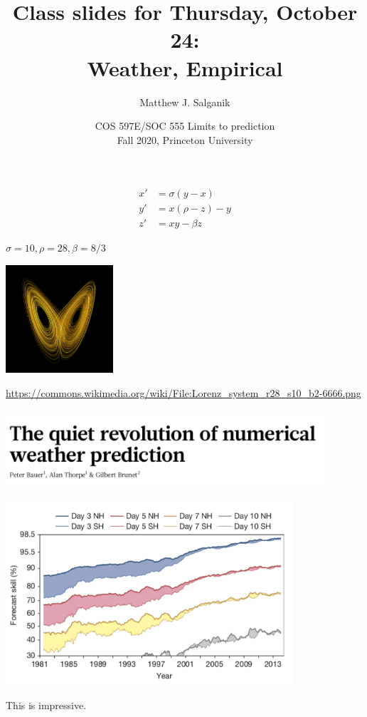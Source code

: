 \documentclass[aspectratio=169]{beamer}
\title[]{Class slides for Thursday, October 24:\\Weather, Empirical}
\author[]{Matthew J. Salganik}
\institute[]{}
\date[]{COS 597E/SOC 555 Limits to prediction\\Fall 2020, Princeton University}
\begin{document}
\frame{\titlepage}
\begin{frame}
\frametitle{}

\begin{align*}
  x' &= \sigma(y-x) \\
  y' &= x(\rho-z)-y \\
  z' &= xy-\beta z
\end{align*}
\begin{center}
$\sigma = 10, \rho = 28,  \beta = 8/3$ 
\end{center}
\begin{center}
\includegraphics[width = 0.3\textwidth]{figures/Lorenz_system_r28_s10_b2-6666}
\end{center}

\vfill
\tiny{\url{https://commons.wikimedia.org/wiki/File:Lorenz_system_r28_s10_b2-6666.png}}
\end{frame}
\begin{frame}
\frametitle{}

\begin{center}
\includegraphics[width = 0.9\textwidth]{figures/bauer_quiet_2015_title}
\end{center}

\end{frame}
\begin{frame}

\begin{center}
\includegraphics[width = 0.8\textwidth]{figures/bauer_quiet_2015_fig1}
\end{center}

\vfill
This is impressive.

\end{frame}
\end{document}
